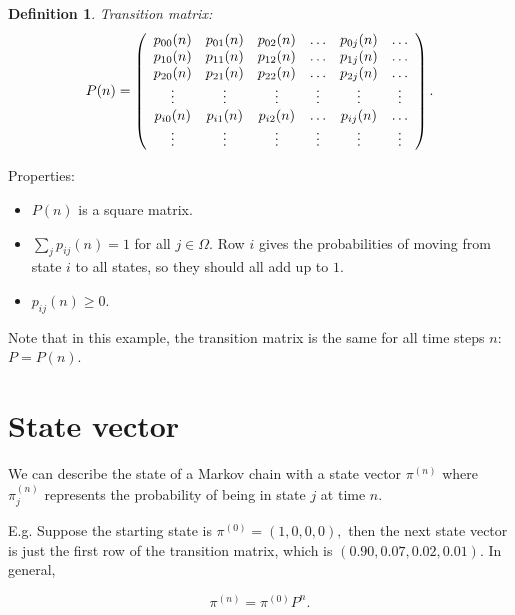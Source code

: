 \documentclass[20pt]{extarticle}
\theoremstyle{plain}
\newtheorem{definition}[theorem]{Definition}
\theoremstyle{definition}
\theoremstyle{remark}
\newcommand{\0}{\varnothing}
\newcommand{\<}{\langle}
\renewcommand{\>}{\rangle}
\begin{document}
\begin{definition}
Transition matrix:
\[
P ( n ) = \left(
\begin{array}{ c c c c c c }
{ p _ { 00 } ( n ) } & { p _ { 01 } ( n ) } & { p _ { 02 } ( n ) } & { \dots } & { p _ { 0 j } ( n ) } & { \dots } \\
{ p _ { 10 } ( n ) } & { p _ { 11 } ( n ) } & { p _ { 12 } ( n ) } & { \dots } & { p _ { 1 j } ( n ) } & { \dots } \\
{ p _ { 20 } ( n ) } & { p _ { 21 } ( n ) } & { p _ { 22 } ( n ) } & { \dots } & { p _ { 2 j } ( n ) } & { \dots } \\
{ \vdots } & { \vdots } & { \vdots } & { \vdots } & { \vdots } & { \vdots } \\
{ p _ { i 0 } ( n ) } & { p _ { i 1 } ( n ) } & { p _ { i 2 } ( n ) } & { \dots } & { p _ { i j } ( n ) } & { \dots } \\
{ \vdots } & { \vdots } & { \vdots } & { \vdots } & { \vdots } & { \vdots }
\end{array}
\right).
\]
\end{definition}

Properties:

\begin{itemize}
\item \( P(n) \) is a square matrix.
\item \( \sum_{j} p_{ij} (n) = 1 \) for all \( j \in \Omega. \) Row \( i \) gives the probabilities of moving from state \( i \) to all states, so they should all add up to \( 1. \)
\item \( p_{ij}(n) \geq 0. \)
\end{itemize}


Note that in this example, the transition matrix is the same for all time steps \( n: \) \( P = P(n). \)

\section{State vector}


We can describe the state of a Markov chain with a state vector \( \pi^{(n)} \) where \( \pi^{(n)}_{j} \) represents the probability of being in state \( j \) at time \( n. \)

E.g. Suppose the starting state is \( \pi ^ { ( 0 ) } = ( 1,0,0,0 ), \) then the next state vector is just the first row of the transition matrix, which is \( (0.90, 0.07, 0.02, 0.01). \) In general,

\[
\pi ^ { ( n ) } = \pi ^ { ( 0 ) } P ^ { n }.
\]
\end{document}
